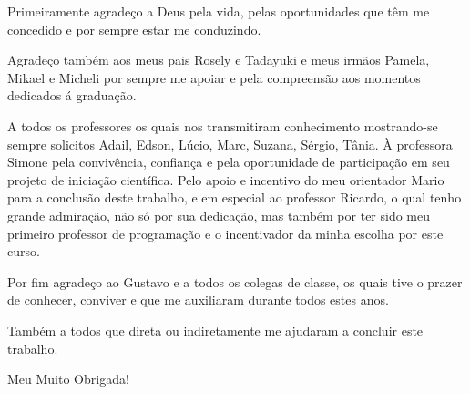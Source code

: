 \begin{agradecimentos}
Primeiramente agradeço a Deus pela vida, pelas oportunidades que têm me concedido e por sempre estar me conduzindo. 

Agradeço também aos meus pais Rosely e Tadayuki e meus irmãos Pamela,  Mikael e Micheli por sempre me apoiar e pela compreensão aos momentos dedicados á graduação.

A todos os professores os quais nos transmitiram conhecimento mostrando-se sempre solicitos Adail, Edson, Lúcio, Marc, Suzana, Sérgio, Tânia. À professora Simone pela convivência, confiança e pela oportunidade de participação em seu projeto de iniciação científica. Pelo apoio e incentivo do meu orientador Mario para a conclusão deste trabalho, e em especial ao professor Ricardo, o qual tenho grande admiração, não só por sua dedicação, mas também por ter sido meu primeiro professor de programação e o incentivador da minha escolha por este curso.

Por fim agradeço ao Gustavo e a todos os colegas de classe, os quais tive o prazer de conhecer, conviver e que me auxiliaram durante todos estes anos.

Também a todos que direta ou indiretamente me ajudaram a concluir este trabalho.

Meu Muito Obrigada!
\end{agradecimentos}
